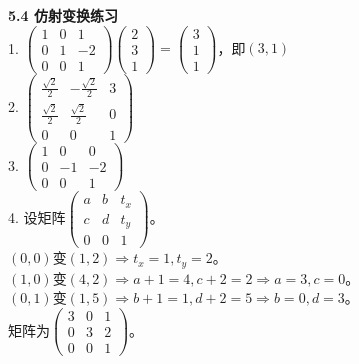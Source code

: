 \documentclass[a4paper,12pt]{ctexart}
\begin{document}
\noindent\textbf{5.4 仿射变换练习}\\
1. $\begin{pmatrix}1&0&1\\0&1&-2\\0&0&1\end{pmatrix}\begin{pmatrix}2\\3\\1\end{pmatrix}=\begin{pmatrix}3\\1\\1\end{pmatrix}$，即$(3,1)$\\
2. $\begin{pmatrix}\frac{\sqrt2}{2}&-\frac{\sqrt2}{2}&3\\\frac{\sqrt2}{2}&\frac{\sqrt2}{2}&0\\0&0&1\end{pmatrix}$\\
3. $\begin{pmatrix}1&0&0\\0&-1&-2\\0&0&1\end{pmatrix}$\\
4. 设矩阵$\begin{pmatrix}a&b&t_x\\c&d&t_y\\0&0&1\end{pmatrix}$。\\
$(0,0)$变$(1,2)\Rightarrow t_x=1,t_y=2$。\\
$(1,0)$变$(4,2)\Rightarrow a+1=4,c+2=2\Rightarrow a=3,c=0$。\\
$(0,1)$变$(1,5)\Rightarrow b+1=1,d+2=5\Rightarrow b=0,d=3$。\\
矩阵为$\begin{pmatrix}3&0&1\\0&3&2\\0&0&1\end{pmatrix}$。

\end{document}
